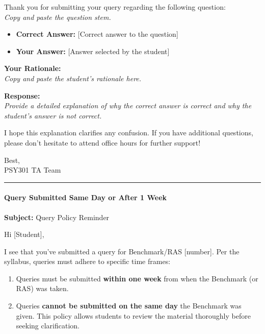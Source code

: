 \documentclass[
]{article}
\providecommand{\tightlist}{%
  \setlength{\itemsep}{0pt}\setlength{\parskip}{0pt}}
\begin{document}
Thank you for submitting your query regarding the following question:\\
\emph{Copy and paste the question stem.}

\begin{itemize}
\tightlist
\item
  \textbf{Correct Answer:} {[}Correct answer to the question{]}\\
\item
  \textbf{Your Answer:} {[}Answer selected by the student{]}
\end{itemize}

\textbf{Your Rationale:}\\
\emph{Copy and paste the student's rationale here.}

\textbf{Response:}\\
\emph{Provide a detailed explanation of why the correct answer is correct and why the student's answer is not correct.}

I hope this explanation clarifies any confusion. If you have additional questions, please don't hesitate to attend office hours for further support!

Best,\\
PSY301 TA Team

\begin{center}\rule{0.5\linewidth}{0.5pt}\end{center}

\hypertarget{query-submitted-same-day-or-after-1-week}{%
\paragraph{Query Submitted Same Day or After 1 Week}\label{query-submitted-same-day-or-after-1-week}}

\textbf{Subject:} Query Policy Reminder

Hi {[}Student{]},

I see that you've submitted a query for Benchmark/RAS {[}number{]}. Per the syllabus, queries must adhere to specific time frames:

\begin{enumerate}
\def\labelenumi{\arabic{enumi}.}
\tightlist
\item
  Queries must be submitted \textbf{within one week} from when the Benchmark (or RAS) was taken.\\
\item
  Queries \textbf{cannot be submitted on the same day} the Benchmark was given. This policy allows students to review the material thoroughly before seeking clarification.
\end{enumerate}
\end{document}
